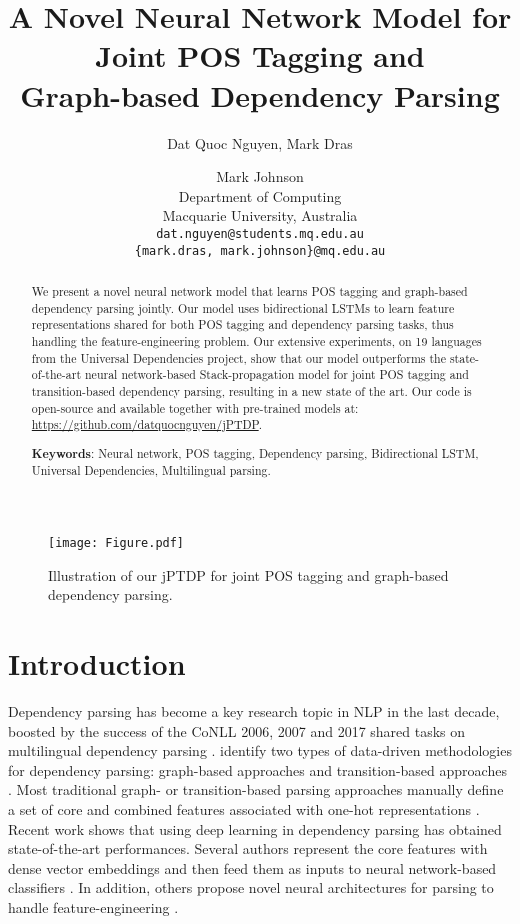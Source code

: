 \documentclass[11pt,letterpaper]{article}
\title{A Novel Neural Network Model for Joint POS Tagging and \\ Graph-based Dependency Parsing}
\author{Dat Quoc Nguyen, Mark Dras \and Mark Johnson \\
Department of Computing \\ 
Macquarie University, Australia \\
{\tt {dat.nguyen@students.mq.edu.au}} \\ {\tt \{mark.dras, mark.johnson\}@mq.edu.au}
}
\begin{document}
\maketitle
\begin{abstract}
We present a novel neural network model that learns POS tagging and graph-based dependency parsing jointly. 
Our model uses bidirectional LSTMs to learn  feature representations shared for both POS tagging and   dependency parsing tasks, thus handling the feature-engineering problem. 
Our extensive experiments, on 19 languages from the Universal Dependencies project, show that our model outperforms the state-of-the-art neural network-based Stack-propagation model for joint POS tagging and transition-based dependency parsing, resulting in a new state of the art. 
Our code is open-source and available together
with pre-trained models at: \url{https://github.com/datquocnguyen/jPTDP}.

\medskip

\textbf{Keywords}: Neural network, POS tagging, Dependency parsing, Bidirectional LSTM, Universal Dependencies, Multilingual parsing.
\end{abstract}


\begin{figure*}[t]
\centering
\texttt{[image: Figure.pdf]}
\caption{Illustration of our jPTDP for joint POS tagging and graph-based dependency parsing.}
\label{fig:model}
\end{figure*}


\section{Introduction}

Dependency parsing has become a key research topic in NLP in the last decade, boosted by the success of the CoNLL
2006, 2007 and 2017 shared tasks on multilingual dependency parsing
\cite{Buchholz2006,Nivre07,udst:overview}. \citet{McDonald2011Nivre} identify two
types of data-driven methodologies for dependency parsing: graph-based approaches
\cite{Eisner:1996,McDonald2005OLT,koo-collins:2010:ACL} and transition-based approaches
\cite{Yamada2003,Nivre2003}.  
 Most traditional graph- or transition-based
parsing approaches 
manually define a set of core and combined features associated with one-hot representations \citep{E06-1011,Nivre2007,Bohnet2010,zhang-nivre:2011:ACL-HLT2011,martinsalmeidasmith2013,choi-mccallum:2013:ACL2013}. Recent work shows that using deep learning in dependency parsing has obtained state-of-the-art performances. Several authors  represent the core features with dense vector embeddings and then feed them as inputs to neural network-based classifiers \citep{chen-manning:2014:EMNLP2014,weiss-EtAl:2015:ACL-IJCNLP,pei-ge-chang:2015:ACL-IJCNLP,andor-EtAl:2016:P16-1}. In addition, others  propose novel neural  architectures for parsing to handle  feature-engineering  \citep{dyer-EtAl:2015:ACL-IJCNLP,cheng-EtAl:2016:EMNLP2016,zhang-zhao-qin:2016:P16-1,wang-chang:2016:P16-1,TACL798,TACL885,DozatM17,MaH17,acl2017dml}. 
\end{document}
